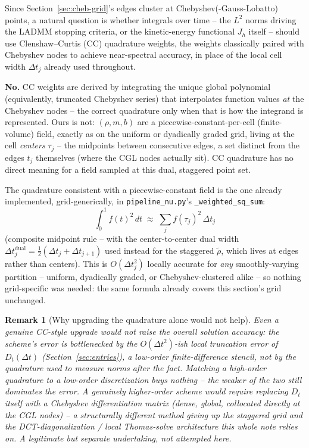 \documentclass[11pt]{article}
\newtheorem{remark}{Remark}
\newcommand{\dt}{\Delta t}
\newcommand{\code}[1]{\texttt{#1}}
\begin{document}
Since Section~\ref{sec:cheb-grid}'s edges cluster at Chebyshev(-Gauss-Lobatto) points, a natural
question is whether integrals over time -- the $L^2$ norms driving the LADMM stopping criteria,
or the kinetic-energy functional $J_h$ itself -- should use Clenshaw--Curtis (CC) quadrature
weights, the weights classically paired with Chebyshev nodes to achieve near-spectral accuracy,
in place of the local cell width $\dt_j$ already used throughout.

\textbf{No.} CC weights are derived by integrating the unique global polynomial (equivalently,
truncated Chebyshev series) that interpolates function values \emph{at} the Chebyshev nodes --
the correct quadrature only when that is how the integrand is represented. Ours is not:
$(\rho,m,b)$ are a piecewise-constant-per-cell (finite-volume) field, exactly as on the uniform
or dyadically graded grid, living at the cell \emph{centers} $\tau_j$ -- the midpoints between
consecutive edges, a set distinct from the edges $t_j$ themselves (where the CGL nodes actually
sit). CC quadrature has no direct meaning for a field sampled at this dual, staggered point set.

The quadrature consistent with a piecewise-constant field is the one already implemented,
grid-generically, in \code{pipeline\_nu.py}'s \code{\_weighted\_sq\_sum}:
\begin{equation}
  \int_0^1 f(t)^2\,dt \;\approx\; \sum_j f(\tau_j)^2\,\dt_j
\end{equation}
(composite midpoint rule -- with the center-to-center dual width $\dt_j^{\mathrm{dual}} =
\tfrac12(\dt_j+\dt_{j+1})$ used instead for the staggered $\tilde\rho$, which lives at edges
rather than centers). This is $O(\dt_j^2)$ locally accurate for \emph{any} smoothly-varying
partition -- uniform, dyadically graded, or Chebyshev-clustered alike -- so nothing
grid-specific was needed: the same formula already covers this section's grid unchanged.

\begin{remark}[Why upgrading the quadrature alone would not help]
Even a genuine CC-style upgrade would not raise the overall solution accuracy: the scheme's
error is bottlenecked by the $O(\dt^2)$-ish local truncation error of $D_t(\dt)$
(Section~\ref{sec:entries}), a low-order finite-difference stencil, not by the quadrature used to
measure norms after the fact. Matching a high-order quadrature to a low-order discretization
buys nothing -- the weaker of the two still dominates the error. A genuinely higher-order scheme
would require replacing $D_t$ itself with a Chebyshev differentiation matrix (dense, global,
collocated directly at the CGL nodes) -- a structurally different method giving up the staggered
grid and the DCT-diagonalization / local Thomas-solve architecture this whole note relies on. A
legitimate but separate undertaking, not attempted here.
\end{remark}
\end{document}
